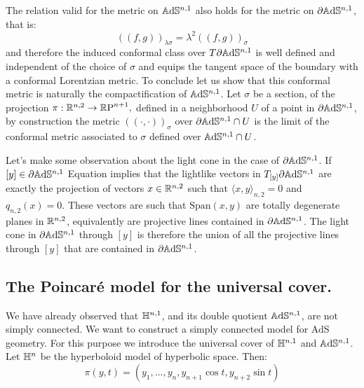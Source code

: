 The relation valid for the metric on $\mathbb{A}\mathrm{d}\mathbb{S}^{n,1}$ also holds for the metric on $\partial\mathbb{A}\mathrm{d}\mathbb{S}^{n,1}$, that is: 
\begin{equation}\label{26}
    ((f,g))_{\lambda\sigma}=\lambda^2((f,g))_{\sigma}
\end{equation} 
and therefore the induced conformal class over $T\partial\mathbb{A}\mathrm{d}\mathbb{S}^{n,1}$ is well defined and independent of the choice of $\sigma$ and equips the tangent space of the boundary with a conformal Lorentzian metric. To conclude let us show that this conformal metric is naturally the compactification of $\mathbb{A}\mathrm{d}\mathbb{S}^{n,1}$. Let $\sigma$ be a section, of the projection $\pi:\mathbb{R}^{n,2}\to \mathbb{R}\text{P}^{n+1},$ defined in a neighborhood $U$ of a point in $\partial\mathbb{A}\mathrm{d}\mathbb{S}^{n,1}$, by construction the metric $((\cdot,\cdot))_\sigma$ over $\partial\mathbb{A}\mathrm{d}\mathbb{S}^{n,1}\cap U$ is the limit of the conformal metric associated to $\sigma$ defined over $\mathbb{A}\mathrm{d}\mathbb{S}^{n,1}\cap U$. %
\begin{observation}\label{222}
Let's make some observation about the light cone in the case of $\partial\mathbb{A}\mathrm{d}\mathbb{S}^{n,1}$. If $[y]\in\partial\mathbb{A}\mathrm{d}\mathbb{S}^{n,1}$ Equation  implies that the lightlike vectors in $T_{[y]}\partial\mathbb{A}\mathrm{d}\mathbb{S}^{n,1}$ are exactly the projection of vectors $x\in \mathbb{R}^{n,2}$ such that $\langle x,y\rangle_{n,2}=0$ and $q_{n,2}(x)=0$. These vectors are such that $\text{Span}(x,y)$ are totally degenerate planes in $\mathbb{R}^{n,2}$, equivalently are projective lines contained in $\partial\mathbb{A}\mathrm{d}\mathbb{S}^{n,1}$. The light cone in $\partial\mathbb{A}\mathrm{d}\mathbb{S}^{n,1}$ through $[y]$ is therefore the union of all the projective lines through $[y]$ that are contained in $\partial\mathbb{A}\mathrm{d}\mathbb{S}^{n,1}$.

\end{observation}


\subsection{The Poincaré model for the universal cover.}
We have already observed that $\mathbb{H}^{n,1}$, and its double quotient $\mathbb{A}\mathrm{d}\mathbb{S}^{n,1}$, are not simply connected. We want to construct a simply connected model for AdS geometry. For this purpose we introduce the universal cover of $\mathbb{H}^{n,1}$ and $\mathbb{A}\mathrm{d}\mathbb{S}^{n,1}$.\\
Let $\mathbb{H}^n$ be the hyperboloid model of hyperbolic space. Then: 
\begin{equation}\label{ogcover}
    \pi(y,t)=(y_1,\dots,y_n,y_{n+1}\cos t,y_{n+2}\sin t)
\end{equation}


